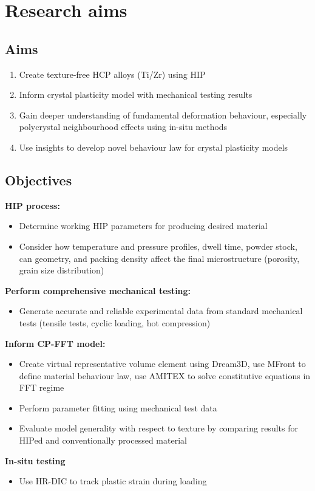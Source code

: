 \chapter{Research aims}

\section{Aims}
\begin{enumerate}
    \item Create texture-free HCP alloys (Ti/Zr) using HIP
    \item Inform crystal plasticity model with mechanical testing results
    \item Gain deeper understanding of fundamental deformation behaviour, especially polycrystal neighbourhood effects using in-situ methods
    \item Use insights to develop novel behaviour law for crystal plasticity models
\end{enumerate}

\section{Objectives}

\textbf{HIP process:}
\begin{itemize}
    \item Determine working HIP parameters for producing desired material
    \item Consider how temperature and pressure profiles, dwell time, powder stock, can geometry, and packing density affect the final microstructure (porosity, grain size distribution)
\end{itemize}

\textbf{Perform comprehensive mechanical testing:}
\begin{itemize}
    \item Generate accurate and reliable experimental data from standard mechanical tests (tensile tests, cyclic loading, hot compression)
\end{itemize}

\pagebreak
\textbf{Inform CP-FFT model:}
\begin{itemize}
    \item Create virtual representative volume element using Dream3D, use MFront to define material behaviour law, use AMITEX to solve constitutive equations in FFT regime
    \item Perform parameter fitting using mechanical test data
    \item Evaluate model generality with respect to texture by comparing results for HIPed and conventionally processed material
\end{itemize}

\textbf{In-situ testing}
\begin{itemize}
    \item Use HR-DIC to track plastic strain during loading 
\end{itemize}